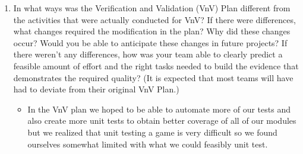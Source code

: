 \documentclass[12pt, titlepage]{article}
\begin{document}
\begin{enumerate}
  \item In what ways was the Verification and Validation (VnV) Plan different
  from the activities that were actually conducted for VnV?  If there were
  differences, what changes required the modification in the plan?  Why did
  these changes occur?  Would you be able to anticipate these changes in future
  projects?  If there weren't any differences, how was your team able to clearly
  predict a feasible amount of effort and the right tasks needed to build the
  evidence that demonstrates the required quality?  (It is expected that most
  teams will have had to deviate from their original VnV Plan.)
  
\begin{itemize}
  \item In the VnV plan we hoped to be able to automate more of our tests and also create more unit tests to obtain better coverage of all of our modules but we realized that unit testing a game is very difficult so we found ourselves somewhat limited with what we could feasibly unit test. 
\end{itemize}
  
\end{enumerate}
\end{document}
